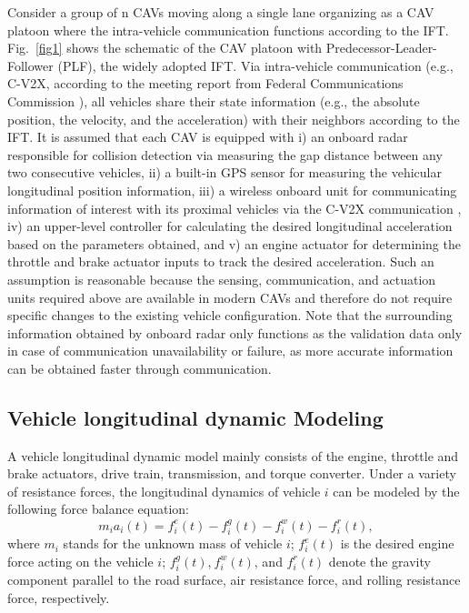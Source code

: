 \documentclass[journal]{IEEEtran}
\begin{document}
Consider a group of n CAVs moving along a single lane organizing as a CAV platoon where the intra-vehicle communication functions according to the IFT. Fig.~\ref{fig1} shows the schematic of the CAV platoon with Predecessor-Leader-Follower (PLF), the widely adopted IFT. Via intra-vehicle communication (e.g., C-V2X, according to the meeting report from Federal Communications Commission \citep{POPEO2020}), all vehicles share their state information (e.g., the absolute position, the velocity, and the acceleration) with their neighbors according to the IFT. It is assumed that each CAV is equipped with i) an onboard radar responsible for collision detection via measuring the gap distance between any two consecutive vehicles, ii) a built-in GPS sensor for measuring the vehicular longitudinal position information, iii) a wireless onboard unit for communicating information of interest with its proximal vehicles via the C-V2X communication \citep{Mannoni2019}, iv) an upper-level controller for calculating the desired longitudinal acceleration based on the parameters obtained, and v) an engine actuator for determining the throttle and brake actuator inputs to track the desired acceleration. Such an assumption is reasonable because the sensing, communication, and actuation units required above are available in modern CAVs and therefore do not require specific changes to the existing vehicle configuration. Note that the surrounding information obtained by onboard radar only functions as the validation data only in case of communication unavailability or failure, as more accurate information can be obtained faster through communication.

\subsection{Vehicle longitudinal dynamic Modeling}
\label{Section 3.1}

A vehicle longitudinal dynamic model mainly consists of the engine, throttle and brake actuators, drive train, transmission, and torque converter. Under a variety of resistance forces, the longitudinal dynamics of vehicle $i$ can be modeled by the following force balance equation:
\begin{equation}
  m_ia_i(t)=f_i^e(t)-f_i^g(t)-f_i^w(t)-f_i^r(t),
  \label{eq1}
\end{equation}
where $m_i$ stands for the unknown mass of vehicle $i$; $f_i^e(t)$ is the desired engine force acting on the vehicle $i$; $f_i^g(t)$,$\ f_i^w(t)$, and $f_i^r(t)$ denote the gravity component parallel to the road surface, air resistance force, and rolling resistance force, respectively.
\end{document}
